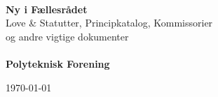 \begin{titlepage}
\centering \parindent=0pt
 \HRule\\[1cm]\Huge
\textbf{Ny i Fællesrådet} \\[0.7cm]
\large Love \& Statutter, Principkatalog, Kommissorier\\ og andre vigtige dokumenter\\[1cm]
\HRule\\[4cm]  
\Large \textbf{Polyteknisk Forening}

 \normalsize %
\begin{flushleft}
\today \end{flushleft}

\end{titlepage}